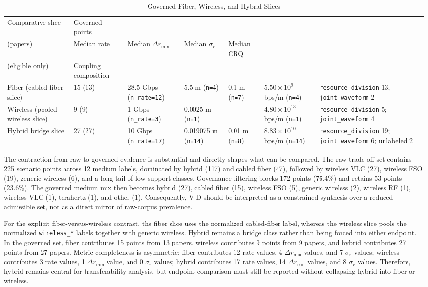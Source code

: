 \begin{table}[htbp]
\caption{Governed Fiber, Wireless, and Hybrid Slices}
\label{tab:comparative_slices}
\centering
\setlength{\tabcolsep}{4pt}
\renewcommand{\arraystretch}{1.08}
\begin{tabularx}{\textwidth}{L{2.3cm} C{1.6cm} Y Y Y Y Y}
\toprule
Comparative slice & Governed points\\(papers) & Median rate & Median $\Delta r_{\min}$ & Median $\sigma_r$ & Median CRQ\\(eligible only) & Coupling composition \\
\midrule
Fiber (cabled fiber slice) & 15 (13) & 28.5 Gbps (\texttt{n\_rate=12}) & 5.5 m (\texttt{n=4}) & 0.1 m (\texttt{n=7}) & $5.50 \times 10^9$ bps/m (\texttt{n=4}) & \texttt{resource\_division} 13; \texttt{joint\_waveform} 2 \\
Wireless (pooled wireless slice) & 9 (9) & 1 Gbps (\texttt{n\_rate=3}) & 0.0025 m (\texttt{n=1}) & -- & $4.80 \times 10^{13}$ bps/m (\texttt{n=1}) & \texttt{resource\_division} 5; \texttt{joint\_waveform} 4 \\
Hybrid bridge slice & 27 (27) & 10 Gbps (\texttt{n\_rate=17}) & 0.019075 m (\texttt{n=14}) & 0.01 m (\texttt{n=8}) & $8.83 \times 10^{10}$ bps/m (\texttt{n=14}) & \texttt{resource\_division} 19; \texttt{joint\_waveform} 6; unlabeled 2 \\
\bottomrule
\end{tabularx}
\end{table}

The contraction from raw to governed evidence is substantial and directly shapes what can be compared. The raw trade-off set contains 225 scenario points across 12 medium labels, dominated by hybrid (117) and cabled fiber (47), followed by wireless VLC (27), wireless FSO (19), generic wireless (6), and a long tail of low-support classes. Governance filtering blocks 172 points (76.4\%) and retains 53 points (23.6\%). The governed medium mix then becomes hybrid (27), cabled fiber (15), wireless FSO (5), generic wireless (2), wireless RF (1), wireless VLC (1), terahertz (1), and other (1). Consequently, V-D should be interpreted as a constrained synthesis over a reduced admissible set, not as a direct mirror of raw-corpus prevalence.

For the explicit fiber-versus-wireless contrast, the fiber slice uses the normalized cabled-fiber label, whereas the wireless slice pools the normalized \texttt{wireless\_*} labels together with generic wireless. Hybrid remains a bridge class rather than being forced into either endpoint. In the governed set, fiber contributes 15 points from 13 papers, wireless contributes 9 points from 9 papers, and hybrid contributes 27 points from 27 papers. Metric completeness is asymmetric: fiber contributes 12 rate values, 4 $\Delta r_{\min}$ values, and 7 $\sigma_r$ values; wireless contributes 3 rate values, 1 $\Delta r_{\min}$ value, and 0 $\sigma_r$ values; hybrid contributes 17 rate values, 14 $\Delta r_{\min}$ values, and 8 $\sigma_r$ values. Therefore, hybrid remains central for transferability analysis, but endpoint comparison must still be reported without collapsing hybrid into fiber or wireless.

